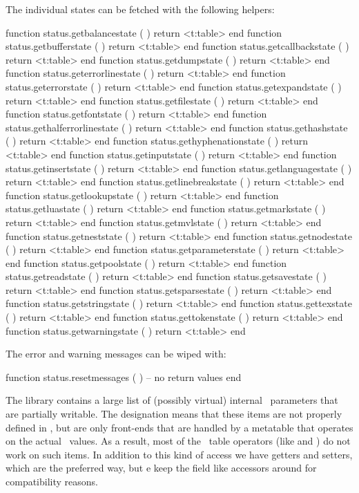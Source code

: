 The individual states can be fetched with the following helpers:

\starttyping[option=LUA]
function status.getbalancestate       ( ) return <t:table> end
function status.getbufferstate        ( ) return <t:table> end
function status.getcallbackstate      ( ) return <t:table> end
function status.getdumpstate          ( ) return <t:table> end
function status.geterrorlinestate     ( ) return <t:table> end
function status.geterrorstate         ( ) return <t:table> end
function status.getexpandstate        ( ) return <t:table> end
function status.getfilestate          ( ) return <t:table> end
function status.getfontstate          ( ) return <t:table> end
function status.gethalferrorlinestate ( ) return <t:table> end
function status.gethashstate          ( ) return <t:table> end
function status.gethyphenationstate   ( ) return <t:table> end
function status.getinputstate         ( ) return <t:table> end
function status.getinsertstate        ( ) return <t:table> end
function status.getlanguagestate      ( ) return <t:table> end
function status.getlinebreakstate     ( ) return <t:table> end
function status.getlookupstate        ( ) return <t:table> end
function status.getluastate           ( ) return <t:table> end
function status.getmarkstate          ( ) return <t:table> end
function status.getmvlstate           ( ) return <t:table> end
function status.getneststate          ( ) return <t:table> end
function status.getnodestate          ( ) return <t:table> end
function status.getparameterstate     ( ) return <t:table> end
function status.getpoolstate          ( ) return <t:table> end
function status.getreadstate          ( ) return <t:table> end
function status.getsavestate          ( ) return <t:table> end
function status.getsparsestate        ( ) return <t:table> end
function status.getstringstate        ( ) return <t:table> end
function status.gettexstate           ( ) return <t:table> end
function status.gettokenstate         ( ) return <t:table> end
function status.getwarningstate       ( ) return <t:table> end
\stoptyping

The error and warning messages can be wiped with:

\starttyping[option=LUA]
function status.resetmessages ( )
    -- no return values
end
\stoptyping

\stopsection

\startsection[title={Everything \TEX}]

\startsubsection[title={Introduction}]

The  library contains a large list of (possibly virtual) internal
\TEX\ parameters that are partially writable. The designation 
means that these items are not properly defined in \LUA, but are only front-ends
that are handled by a metatable that operates on the actual \TEX\ values. As a
result, most of the \LUA\ table operators (like  and \type {#}) do
not work on such items. In addition to this kind of access we have getters and
setters, which are the preferred way, but e keep the field like accessors around
for compatibility reasons.

